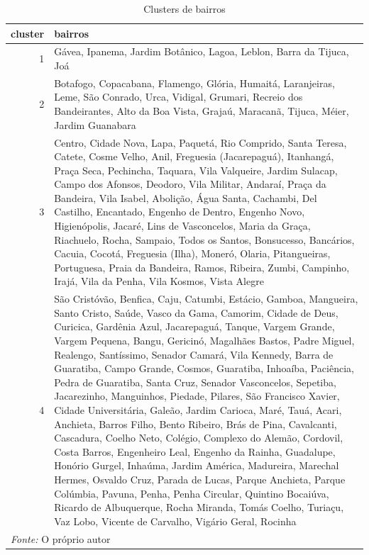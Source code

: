 \documentclass[
	12pt,				%
	a4paper,		%
	oneside,    %
	chapter=TITLE,		   %
	section=TITLE,		   %
	subsection=TITLE,	   %
	subsubsection=TITLE, %
	english,			%
	french,				%
	spanish,			%
	brazil,				%
]{abntex2}
\begin{document}
\begin{table}

\caption{\label{tab:cluster_bairros}Clusters de bairros}
\centering
\begin{tabular}[t]{r|>{\raggedright\arraybackslash}p{15cm}}
\hline
cluster & bairros\\
\hline
1 & Gávea, Ipanema, Jardim Botânico, Lagoa, Leblon, Barra da Tijuca, Joá\\
\hline
2 & Botafogo, Copacabana, Flamengo, Glória, Humaitá, Laranjeiras, Leme, São Conrado, Urca, Vidigal, Grumari, Recreio dos Bandeirantes, Alto da Boa Vista, Grajaú, Maracanã, Tijuca, Méier, Jardim Guanabara\\
\hline
3 & Centro, Cidade Nova, Lapa, Paquetá, Rio Comprido, Santa Teresa, Catete, Cosme Velho, Anil, Freguesia (Jacarepaguá), Itanhangá, Praça Seca, Pechincha, Taquara, Vila Valqueire, Jardim Sulacap, Campo dos Afonsos, Deodoro, Vila Militar, Andaraí, Praça da Bandeira, Vila Isabel, Abolição, Água Santa, Cachambi, Del Castilho, Encantado, Engenho de Dentro, Engenho Novo, Higienópolis, Jacaré, Lins de Vasconcelos, Maria da Graça, Riachuelo, Rocha, Sampaio, Todos os Santos, Bonsucesso, Bancários, Cacuia, Cocotá, Freguesia (Ilha), Moneró, Olaria, Pitangueiras, Portuguesa, Praia da Bandeira, Ramos, Ribeira, Zumbi, Campinho, Irajá, Vila da Penha, Vila Kosmos, Vista Alegre\\
\hline
4 & São Cristóvão, Benfica, Caju, Catumbi, Estácio, Gamboa, Mangueira, Santo Cristo, Saúde, Vasco da Gama, Camorim, Cidade de Deus, Curicica, Gardênia Azul, Jacarepaguá, Tanque, Vargem Grande, Vargem Pequena, Bangu, Gericinó, Magalhães Bastos, Padre Miguel, Realengo, Santíssimo, Senador Camará, Vila Kennedy, Barra de Guaratiba, Campo Grande, Cosmos, Guaratiba, Inhoaíba, Paciência, Pedra de Guaratiba, Santa Cruz, Senador Vasconcelos, Sepetiba, Jacarezinho, Manguinhos, Piedade, Pilares, São Francisco Xavier, Cidade Universitária, Galeão, Jardim Carioca, Maré, Tauá, Acari, Anchieta, Barros Filho, Bento Ribeiro, Brás de Pina, Cavalcanti, Cascadura, Coelho Neto, Colégio, Complexo do Alemão, Cordovil, Costa Barros, Engenheiro Leal, Engenho da Rainha, Guadalupe, Honório Gurgel, Inhaúma, Jardim América, Madureira, Marechal Hermes, Osvaldo Cruz, Parada de Lucas, Parque Anchieta, Parque Colúmbia, Pavuna, Penha, Penha Circular, Quintino Bocaiúva, Ricardo de Albuquerque, Rocha Miranda, Tomás Coelho, Turiaçu, Vaz Lobo, Vicente de Carvalho, Vigário Geral, Rocinha\\
\hline
\multicolumn{2}{l}{\textit{Fonte: } O próprio autor}\\
\end{tabular}
\end{table}
\end{document}
